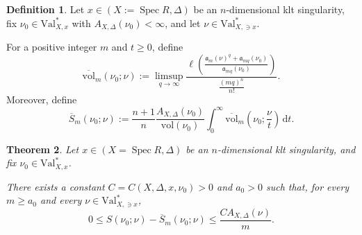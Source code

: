 \documentclass[a4paper,12pt]{amsart}
\newtheorem{theorem}{Theorem}[section]
\theoremstyle{definition} %
\newtheorem{definition}[theorem]{Definition}
\theoremstyle{remark}
\numberwithin{equation}{section}
\def\Spec{\operatorname{Spec}}
\begin{document}
\begin{definition}
Let $x\in (X:=\Spec R,\Delta)$ be an $n$-dimensional klt singularity, fix $\nu_0\in \mathrm{Val}^*_{X,x}$ with $A_{X,\Delta}(\nu_0)<\infty$, and let $\nu\in \mathrm{Val}^*_{X,\ni x}$.

\smallskip

For a positive integer $m$ and $t\ge 0$, define
$$ \overline{\mathrm{vol}}_m\left(\nu_0;\nu\right):=\limsup_{q\to \infty}\frac{\ell\left(\frac{\mathfrak{a}_{m}(\nu)^q+\mathfrak{a}_{mq}(\nu_0)}{\mathfrak{a}_{mq}(\nu_0)}\right)}{\frac{(mq)^n}{n!}}.$$
Moreover, define
$$ \overline{S}_m(\nu_0;\nu):=\frac{n+1}{n}\frac{A_{X,\Delta}(\nu_0)}{\mathrm{vol}(\nu_0)}\int^{\infty}_{0}\overline{\mathrm{vol}}_m\left(\nu_0;\frac{\nu}{t}\right)\,\mathrm{d}t. $$
\end{definition}

\begin{theorem} \label{theorem}
Let $x\in (X=\Spec R,\Delta)$ be an $n$-dimensional klt singularity, and fix $\nu_0\in \mathrm{Val}^*_{X,x}$.

\smallskip

There exists a constant $C=C(X,\Delta,x,\nu_0)>0$ and $a_0>0$ such that, for every $m\ge a_0$ and every $\nu\in \mathrm{Val}^*_{X,\ni x}$,
$$ 0\le S(\nu_0;\nu)-\overline{S}_m(\nu_0;\nu)\le \frac{CA_{X,\Delta}(\nu)}{m}.$$
\end{theorem}
\end{document}
